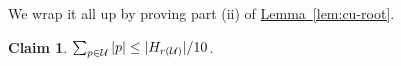 \documentclass[11pt]{article}
\newtheorem{claim}[theorem]{Claim}
\theoremstyle{definition}
\newcommand{\cU}{{\cal U}}
\newcommand{\Clm}[1]{\hyperref[clm:#1]{Claim~\ref*{clm:#1}}} %
\newcommand{\Lem}[1]{\hyperref[lem:#1]{Lemma~\ref*{lem:#1}}} %
\newcommand{\redH}{\widetilde{H}}
\begin{document}
% 
% 

We wrap it all up by proving part (ii) of \Lem{cu-root}.

\begin{claim} $\sum_{p \in \cU} |p| \leq |H_{r(\cU)}|/10$.
\end{claim}

% 
\end{document}
